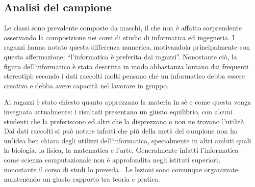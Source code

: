 \subsection{Analisi del campione}
Le classi sono prevalente composte da maschi, il che non è affatto sorprendente osservando la composizione nei corsi di studio di informatica ed ingegneria. I ragazzi hanno notato questa differenza numerica, motivandola principalmente con questa affermazione: “l'informatica è preferita dai ragazzi”. Nonostante ciò, la figura dell’informatico è stata descritta in modo abbastanza lontano dai frequenti stereotipi: secondo i dati raccolti molti pensano che un informatico debba essere creativo e debba avere capacità nel lavorare in gruppo. 

Ai ragazzi è stato chiesto quanto apprezzano la materia in sè e come questa venga insegnata attualmente: i risultati presentano un giusto equilibrio, con alcuni studenti che la preferiscono ed altri che la disprezzano o non ne trovano l'utilità. Dai dati raccolti si può notare infatti che piú della metà del campione non ha un'idea ben chiara degli utilizzi dell'informatica, specialmente in altri ambiti quali la biologia, la fisica, la matematica e l'arte. Generalmente infatti l'informatica come scienza computazionale non è approfondita negli istituti superiori, nonostante il corso di studi lo preveda \cite{riforma}. Le lezioni sono comunque organizzate mantenendo un giusto rapporto tra teoria e pratica.


